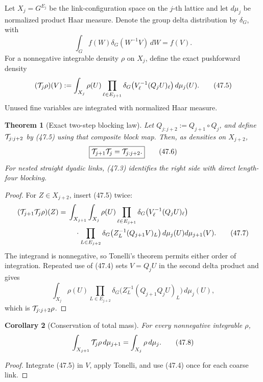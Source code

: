 \documentclass[11pt,oneside]{book}
\newtheorem{theorem}{Theorem}[chapter]
\newtheorem{corollary}[theorem]{Corollary}
\theoremstyle{definition}
\theoremstyle{remark}
\begin{document}
Let \(X_j=G^{E_j}\) be the link-configuration space on the
\(j\)-th lattice and let \(d\mu_j\) be normalized product Haar
measure.  Denote the group delta distribution by \(\delta_G\), with
\[
 \int_G f(W)\delta_G(W^{-1}V)\,dW=f(V).                        \tag{47.4}
\]
For a nonnegative integrable density \(\rho\) on \(X_j\), define
the exact pushforward density
\[
 ({\cal T}_{j}\rho)(V)
 :=\int_{X_j}\rho(U)
 \prod_{\ell\in E_{j+1}}
 \delta_G\bigl(V_\ell^{-1}(Q_jU)_\ell\bigr)\,d\mu_j(U).        \tag{47.5}
\]
Unused fine variables are integrated with normalized Haar measure.

\begin{theorem}[Exact two-step blocking law]
\label{thm:e8v47-RG-semigroup}
Let \(Q_{j:j+2}:=Q_{j+1}\circ Q_j\), and define
\({\cal T}_{j:j+2}\) by (47.5) using that composite block map.
Then, as densities on \(X_{j+2}\),
\[
 \boxed{{\cal T}_{j+1}{\cal T}_j
       ={\cal T}_{j:j+2}.}                                   \tag{47.6}
\]
For nested straight dyadic links, (47.3) identifies the right side
with direct length-four blocking.
\end{theorem}

\begin{proof}
For \(Z\in X_{j+2}\), insert (47.5) twice:
\[
\begin{split}
 ({\cal T}_{j+1}{\cal T}_j\rho)(Z)
 ={}&\int_{X_{j+1}}\int_{X_j}\rho(U)
 \prod_{\ell\in E_{j+1}}
 \delta_G\bigl(V_\ell^{-1}(Q_jU)_\ell\bigr)\\
 &\quad\cdot
 \prod_{L\in E_{j+2}}
 \delta_G\bigl(Z_L^{-1}(Q_{j+1}V)_L\bigr)
 \,d\mu_j(U)d\mu_{j+1}(V).                                  \tag{47.7}
\end{split}
\]
The integrand is nonnegative, so Tonelli's theorem permits either
order of integration.  Repeated use of (47.4) sets \(V=Q_jU\) in
the second delta product and gives
\[
 \int_{X_j}\rho(U)
 \prod_{L\in E_{j+2}}
 \delta_G\bigl(
 Z_L^{-1}(Q_{j+1}Q_jU)_L\bigr)\,d\mu_j(U),
\]
which is \({\cal T}_{j:j+2}\rho\).
\end{proof}

\begin{corollary}[Conservation of total mass]
\label{cor:e8v47-mass-conservation}
For every nonnegative integrable \(\rho\),
\[
 \int_{X_{j+1}}{\cal T}_j\rho\,d\mu_{j+1}
 =\int_{X_j}\rho\,d\mu_j.                                    \tag{47.8}
\]
\end{corollary}

\begin{proof}
Integrate (47.5) in \(V\), apply Tonelli, and use (47.4) once for
each coarse link.
\end{proof}
\end{document}
